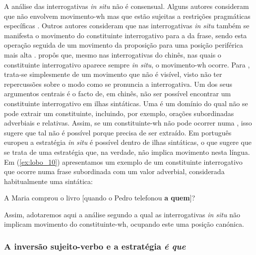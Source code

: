 \documentclass[output=paper]{LSP/langsci}
\begin{document}
A análise das interrogativas \textit{in situ} não é consensual. Alguns autores consideram que não envolvem movimento-wh mas que estão sujeitas a restrições pragmáticas específicas \citep{pirestaylor2007}. Outros autores consideram que nas interrogativas \textit{in situ} também se manifesta o movimento do constituinte interrogativo para a  da frase, sendo esta operação seguida de um movimento da proposição para uma posição periférica mais alta \citep{ambar2003,kato2013}. \citet{huang1982} propôs que, mesmo nas interrogativas do chinês, nas quais o constituinte interrogativo aparece sempre \textit{in situ}, o movimento-wh ocorre. Para \citet{huang1982}, trata-se simplesmente de um movimento que não é visível, visto não ter repercussões sobre o modo como se pronuncia a interrogativa. Um dos seus argumentos centrais é o facto de, em chinês, não ser possível encontrar um constituinte interrogativo em ilhas sintáticas. Uma  é um domínio do qual não se pode extrair um constituinte, incluindo, por exemplo, orações subordinadas adverbiais e relativas. Assim, se um constituinte-wh não pode ocorrer numa , isso sugere que tal não é possível porque precisa de ser extraído. Em português europeu a estratégia \textit{in situ} é possível dentro de ilhas sintáticas, o que sugere que se trata de uma estratégia que, na verdade, não implica movimento nesta língua. Em (\ref{ex:lobo_10}) apresentamos um exemplo de um constituinte interrogativo que ocorre numa frase subordinada com um valor adverbial, considerada habitualmente uma  sintática:

\ea\label{ex:lobo_10} A Maria comprou o livro [quando o Pedro telefonou \textbf{a quem}]?\z

Assim, adotaremos aqui a análise segundo a qual as interrogativas \textit{in situ} não implicam movimento do constituinte-wh, ocupando este uma posição canónica.


\subsubsection{A inversão sujeito-verbo e a estratégia \textit{é que}}
\label{subsubsec:lobo_inversao_suj_v}
\end{document}
